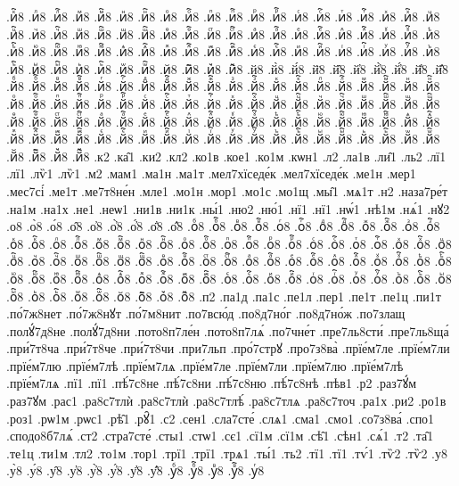 {.иⷦ҇8
.иⷧ8
.иⷧ҇8
.иⷨ8
.иⷨ҇8
.иⷩ8
.иⷩ҇8
.иⷪ8
.иⷪ҇8
.иⷫ8
.иⷫ҇8
.иⷬ8
.иⷬ҇8
.иⷭ8
.иⷭ҇8
.иⷮ8
.иⷮ҇8
.иⷯ8
.иⷯ҇8
.иⷰ8
.иⷰ҇8
.иⷱ8
.иⷱ҇8
.иⷲ8
.иⷲ҇8
.иⷳ8
.иⷳ҇8
.иⷴ8
.иⷴ҇8
.иⷵ8
.иⷵ҇8
.иⷶ8
.иⷶ҇8
.иⷷ8
.иⷷ҇8
.иⷸ8
.иⷸ҇8
.иⷹ8
.иⷹ҇8
.иⷺ8
.иⷺ҇8
.иⷻ8
.иⷻ҇8
.иⷼ8
.иⷼ҇8
.иⷽ8
.иⷽ҇8
.иⷾ8
.иⷾ҇8
.иⷿ8
.иⷿ҇8
.иꙴ8
.иꙴ҇8
.иꙵ8
.иꙵ҇8
.иꙶ8
.иꙶ҇8
.иꙷ8
.иꙷ҇8
.иꙸ8
.иꙸ҇8
.иꙹ8
.иꙹ҇8
.иꙺ8
.иꙺ҇8
.иꙻ8
.иꙻ҇8
.и꙼8
.и꙼҇8
.и꙽8
.и꙽҇8
.й8
.й̀8
.й́8
.й̈8
.й̑8
.й҆8
.й҆̀8
.й҆́8
.й҆̈8
.й҆̑8
.йⷠ8
.йⷠ҇8
.йⷡ8
.йⷡ҇8
.йⷢ8
.йⷢ҇8
.йⷣ8
.йⷣ҇8
.йⷤ8
.йⷤ҇8
.йⷥ8
.йⷥ҇8
.йⷦ8
.йⷦ҇8
.йⷧ8
.йⷧ҇8
.йⷨ8
.йⷨ҇8
.йⷩ8
.йⷩ҇8
.йⷪ8
.йⷪ҇8
.йⷫ8
.йⷫ҇8
.йⷬ8
.йⷬ҇8
.йⷭ8
.йⷭ҇8
.йⷮ8
.йⷮ҇8
.йⷯ8
.йⷯ҇8
.йⷰ8
.йⷰ҇8
.йⷱ8
.йⷱ҇8
.йⷲ8
.йⷲ҇8
.йⷳ8
.йⷳ҇8
.йⷴ8
.йⷴ҇8
.йⷵ8
.йⷵ҇8
.йⷶ8
.йⷶ҇8
.йⷷ8
.йⷷ҇8
.йⷸ8
.йⷸ҇8
.йⷹ8
.йⷹ҇8
.йⷺ8
.йⷺ҇8
.йⷻ8
.йⷻ҇8
.йⷼ8
.йⷼ҇8
.йⷽ8
.йⷽ҇8
.йⷾ8
.йⷾ҇8
.йⷿ8
.йⷿ҇8
.йꙴ8
.йꙴ҇8
.йꙵ8
.йꙵ҇8
.йꙶ8
.йꙶ҇8
.йꙷ8
.йꙷ҇8
.йꙸ8
.йꙸ҇8
.йꙹ8
.йꙹ҇8
.йꙺ8
.йꙺ҇8
.йꙻ8
.йꙻ҇8
.й꙼8
.й꙼҇8
.й꙽8
.й꙽҇8
.к2
.ка̑1
.ки2
.кл2
.ко1в
.кое1
.ко1м
.кѡн1
.л2
.ла1в
.ли̑1
.ль2
.лї1
.лї1
.лѷ1
.лѷ1
.м2
.мам1
.ма1н
.ма1т
.мел7хїседе́к
.мел7хїседе́к
.ме1н
.мер1
.мес7сі́
.ме1т
.ме7т8не́н
.мле1
.мо1н
.мор1
.мо1с
.мо1щ
.мы̑1
.мѧ1т
.н2
.наза7ре́т
.на1м
.на1х
.не1
.неѡ1
.ни1в
.ни1к
.ны́1
.ню2
.ню́1
.нї1
.нї1
.нѡ́1
.нѣ1м
.нѧ́1
.нꙋ2
.о8
.о̀8
.о́8
.о̑8
.о҆8
.о҆̀8
.о҆́8
.о҆̈8
.о҆̑8
.оⷠ8
.оⷠ҇8
.оⷡ8
.оⷡ҇8
.оⷢ8
.оⷢ҇8
.оⷣ8
.оⷣ҇8
.оⷤ8
.оⷤ҇8
.оⷥ8
.оⷥ҇8
.оⷦ8
.оⷦ҇8
.оⷧ8
.оⷧ҇8
.оⷨ8
.оⷨ҇8
.оⷩ8
.оⷩ҇8
.оⷪ8
.оⷪ҇8
.оⷫ8
.оⷫ҇8
.оⷬ8
.оⷬ҇8
.оⷭ8
.оⷭ҇8
.оⷮ8
.оⷮ҇8
.оⷯ8
.оⷯ҇8
.оⷰ8
.оⷰ҇8
.оⷱ8
.оⷱ҇8
.оⷲ8
.оⷲ҇8
.оⷳ8
.оⷳ҇8
.оⷴ8
.оⷴ҇8
.оⷵ8
.оⷵ҇8
.оⷶ8
.оⷶ҇8
.оⷷ8
.оⷷ҇8
.оⷸ8
.оⷸ҇8
.оⷹ8
.оⷹ҇8
.оⷺ8
.оⷺ҇8
.оⷻ8
.оⷻ҇8
.оⷼ8
.оⷼ҇8
.оⷽ8
.оⷽ҇8
.оⷾ8
.оⷾ҇8
.оⷿ8
.оⷿ҇8
.оꙴ8
.оꙴ҇8
.оꙵ8
.оꙵ҇8
.оꙶ8
.оꙶ҇8
.оꙷ8
.оꙷ҇8
.оꙸ8
.оꙸ҇8
.оꙹ8
.оꙹ҇8
.оꙺ8
.оꙺ҇8
.оꙻ8
.оꙻ҇8
.о꙼8
.о꙼҇8
.о꙽8
.о꙽҇8
.п2
.па1д
.па1с
.пе1л
.пер1
.пе1т
.пе1ц
.пи1т
.по́7ж8нет
.по́7ж8нꙋт
.по́7м8нит
.по7всю́д
.по8д7но́г
.по8д7но́ж
.по7злащ
.полꙋ́7д8не
.полꙋ́7д8ни
.пото8п7ле́н
.пото8п7лѧ́
.по7чне́т
.пре7ль8сти́
.пре7ль8ща́
.при́7т8ча
.при́7т8че
.при́7т8чи
.при7льп
.про́7стрꙋ
.про7з8ва̀
.прїе́м7ле
.прїе́м7ли
.прїе́м7лю
.прїе́м7лѣ
.прїе́м7лѧ
.прїе́м7ле
.прїе́м7ли
.прїе́м7лю
.прїе́м7лѣ
.прїе́м7лѧ
.пї1
.пї1
.пѣ́7с8не
.пѣ́7с8ни
.пѣ́7с8ню
.пѣ́7с8нѣ
.пѣв1
.р2
.раз7ꙋ́м
.раз7ꙋм
.рас1
.ра8с7тлѝ
.ра8с7тлѝ
.ра8с7тлѣ́
.ра8с7тлѧ
.ра8с7точ
.ра1х
.ри2
.ро1в
.роз1
.рѡ1м
.рѡс1
.рѣ̑1
.рꙋ̑1
.с2
.сен1
.сла7сте́
.слѧ1
.сма1
.смо1
.со7з8ва́
.спо1
.сподо8б7лѧ́
.ст2
.стра7сте́
.сты1
.стѡ1
.сє1
.сї1м
.сї1м
.сѣ̑1
.сѣн1
.сѧ́1
.т2
.та̑1
.те1ц
.ти1м
.тл2
.то1м
.тор1
.трї1
.трї1
.трѧ1
.ты́1
.ть2
.тї1
.тї1
.тѵ́1
.тѷ2
.тѷ2
.у8
.у̀8
.у́8
.у̑8
.у҆8
.у҆̀8
.у҆́8
.у҆̈8
.у҆̑8
.уⷠ8
.уⷠ҇8
.уⷡ8
.уⷡ҇8
.уⷢ8
}
